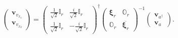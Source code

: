 \documentclass[aps, preprint]{revtex4}
\begin{document}
\begin{equation}\left (\begin{array}{c}\mathbf{v}_{v_{x_{1}}} \\
\mathbf{v}_{v_{x_{2}}}\end{array}\right ) =\left (\begin{array}{cc}\frac{1}{\sqrt{2}} \mathbb{I}_{r} & \frac{i}{\sqrt{2}} \mathbb{I}_{r} \\
\frac{1}{\sqrt{2}} \mathbb{I}_{r} &  -\frac{i}{\sqrt{2}} \mathbb{I}_{r}\end{array}\right )^{ \dag } \left (\begin{array}{cc}\mathbf{\xi }_{r} & \mathbb{O}_{r} \\
\mathbb{O}_{r} & \overline{\mathbf{\xi }_{r}}\end{array}\right )^{ -1} \left (\begin{array}{c}\mathbf{v}_{a^{ \dag }} \\
\mathbf{v}_{a}\end{array}\right )\text{.}
\end{equation}
\end{document}
